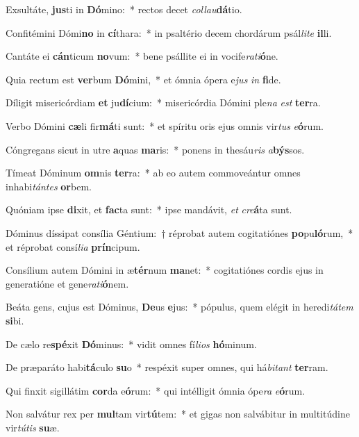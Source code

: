 \item Exsultáte, \textbf{jus}ti in \textbf{Dó}mino:~* rectos decet \textit{col}\textit{lau}\textbf{dá}tio.
\item Confitémini Dómi\textbf{no} in \textbf{cí}thara:~* in psaltério decem chordárum psál\textit{li}\textit{te} \textbf{il}li.
\item Cantáte ei \textbf{cán}ticum \textbf{no}vum:~* bene psállite ei in vocife\textit{ra}\textit{ti}\textbf{ó}ne.
\item Quia rectum est \textbf{ver}bum \textbf{Dó}mini,~* et ómnia ópera e\textit{jus} \textit{in} \textbf{fi}de.
\item Díligit misericórdiam \textbf{et} ju\textbf{dí}cium:~* misericórdia Dómini ple\textit{na} \textit{est} \textbf{ter}ra.
\item Verbo Dómini \textbf{cæ}li fir\textbf{má}ti sunt:~* et spíritu oris ejus omnis vir\textit{tus} \textit{e}\textbf{ó}rum.
\item Cóngregans sicut in utre \textbf{a}quas \textbf{ma}ris:~* ponens in thesáu\textit{ris} \textit{a}\textbf{býs}sos.
\item Tímeat Dóminum \textbf{om}nis \textbf{ter}ra:~* ab eo autem commoveántur omnes inhabi\textit{tán}\textit{tes} \textbf{or}bem.
\item Quóniam ipse \textbf{di}xit, et \textbf{fac}ta sunt:~* ipse mandávit, \textit{et} \textit{cre}\textbf{á}ta sunt.
\item Dóminus díssipat consília Géntium:~† réprobat autem cogitatiónes \textbf{po}pu\textbf{ló}rum,~* et réprobat consí\textit{li}\textit{a} \textbf{prín}cipum.
\item Consílium autem Dómini in æ\textbf{tér}num \textbf{ma}net:~* cogitatiónes cordis ejus in generatióne et gene\textit{ra}\textit{ti}\textbf{ó}nem.
\item Beáta gens, cujus est Dóminus, \textbf{De}us \textbf{e}jus:~* pópulus, quem elégit in heredi\textit{tá}\textit{tem} \textbf{si}bi.
\item De cælo re\textbf{spé}xit \textbf{Dó}minus:~* vidit omnes fí\textit{li}\textit{os} \textbf{hó}minum.
\item De præparáto habi\textbf{tá}culo \textbf{su}o~* respéxit super omnes, qui há\textit{bi}\textit{tant} \textbf{ter}ram.
\item Qui finxit sigillátim \textbf{cor}da e\textbf{ó}rum:~* qui intélligit ómnia ópe\textit{ra} \textit{e}\textbf{ó}rum.
\item Non salvátur rex per \textbf{mul}tam vir\textbf{tú}tem:~* et gigas non salvábitur in multitúdine vir\textit{tú}\textit{tis} \textbf{su}æ.
